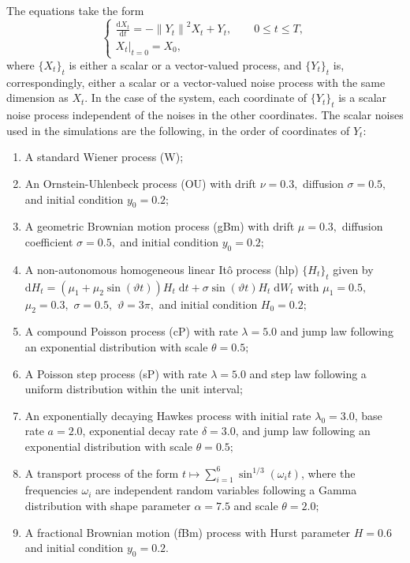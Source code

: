 \documentclass[reqno,12pt]{amsart}
\theoremstyle{plain} %
\theoremstyle{definition} %
\begin{document}
The equations take the form
\begin{equation}
    \label{supp:allnoisesRODEsystem}
    \begin{cases}
        \displaystyle \frac{\mathrm{d}{X}_t}{\mathrm{d} t} = - \left\|{Y}_t\right\|^2 {X}_t + {Y}_t, \qquad 0 \leq t \leq T, \\
        \left. {X}_t \right|_{t = 0} = {X}_0,
    \end{cases}
\end{equation}
where $\{{X}_t\}_t$ is either a scalar or a vector-valued process, and $\{{Y}_t\}_t$ is, correspondingly, either a scalar or a vector-valued noise process with the same dimension as ${X}_t$. In the case of the system, each coordinate of $\{{Y}_t\}_t$ is a scalar noise process independent of the noises in the other coordinates. The scalar noises used in the simulations are the following, in the order of coordinates of ${Y}_t$:
\begin{enumerate}
    \item A standard Wiener process (W);
    \item An Ornstein-Uhlenbeck process (OU) with drift $\nu = 0.3,$ diffusion $\sigma = 0.5,$ and initial condition $y_0 = 0.2$;
    \item A geometric Brownian motion process (gBm) with drift $\mu = 0.3,$ diffusion coefficient $\sigma = 0.5,$ and initial condition $y_0 = 0.2$;
    \item A non-autonomous homogeneous linear It\^o process (hlp) $\{H_t\}_t$ given by $\mathrm{d}H_t = (\mu_1 + \mu_2\sin(\vartheta t))H_t\;\mathrm{d}t + \sigma\sin(\vartheta t)H_t\;\mathrm{d}W_t$ with $\mu_1 = 0.5,$ $\mu_2 = 0.3,$ $\sigma = 0.5,$ $\vartheta=3\pi,$ and initial condition $H_0 = 0.2;$
    \item A compound Poisson process (cP) with rate $\lambda = 5.0$ and jump law following an exponential distribution with scale $\theta = 0.5;$
    \item A Poisson step process (sP) with rate $\lambda = 5.0$ and step law following a uniform distribution within the unit interval;
    \item An exponentially decaying Hawkes process with initial rate $\lambda_0 = 3.0$, base rate $a = 2.0$, exponential decay rate $\delta = 3.0$, and jump law following an exponential distribution with scale $\theta = 0.5;$
    \item A transport process of the form $t \mapsto \sum_{i=1}^{6} \sin^{1/3}(\omega_i t)$, where the frequencies $\omega_i$ are independent random variables following a Gamma distribution with shape parameter $\alpha = 7.5$ and scale $\theta = 2.0;$
    \item A fractional Brownian motion (fBm) process with Hurst parameter $H=0.6$ and initial condition $y_0 = 0.2$.
\end{enumerate}
\end{document}
